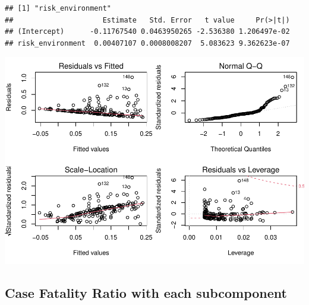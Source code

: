 \documentclass[
]{article}
\begin{document}
\begin{verbatim}
## [1] "risk_environment"
##                     Estimate   Std. Error   t value     Pr(>|t|)
## (Intercept)      -0.11767540 0.0463950265 -2.536380 1.206497e-02
## risk_environment  0.00407107 0.0008008207  5.083623 9.362623e-07
\end{verbatim}

\includegraphics{Basic-Regression_files/figure-latex/unnamed-chunk-5-6.pdf}

\hypertarget{case-fatality-ratio-with-each-subcomponent}{%
\subsection{Case Fatality Ratio with each
subcomponent}\label{case-fatality-ratio-with-each-subcomponent}}
\end{document}
